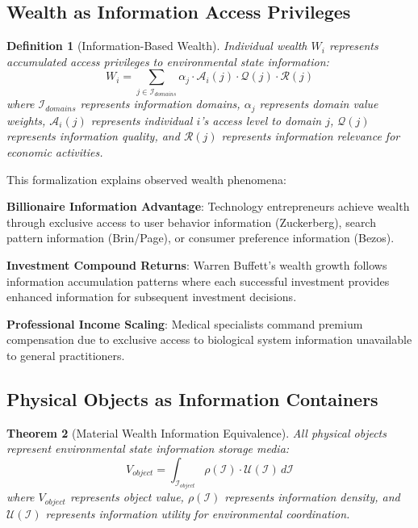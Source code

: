 \documentclass[12pt,a4paper]{article}
\newtheorem{theorem}{Theorem}
\newtheorem{definition}[theorem]{Definition}
\begin{document}
\subsection{Wealth as Information Access Privileges}

\begin{definition}[Information-Based Wealth]
Individual wealth $W_i$ represents accumulated access privileges to environmental state information:
\begin{equation}
W_i = \sum_{j \in \mathcal{I}_{domains}} \alpha_j \cdot \mathcal{A}_i(j) \cdot \mathcal{Q}(j) \cdot \mathcal{R}(j)
\end{equation}
where $\mathcal{I}_{domains}$ represents information domains, $\alpha_j$ represents domain value weights, $\mathcal{A}_i(j)$ represents individual $i$'s access level to domain $j$, $\mathcal{Q}(j)$ represents information quality, and $\mathcal{R}(j)$ represents information relevance for economic activities.
\end{definition}

This formalization explains observed wealth phenomena:

\textbf{Billionaire Information Advantage}: Technology entrepreneurs achieve wealth through exclusive access to user behavior information (Zuckerberg), search pattern information (Brin/Page), or consumer preference information (Bezos).

\textbf{Investment Compound Returns}: Warren Buffett's wealth growth follows information accumulation patterns where each successful investment provides enhanced information for subsequent investment decisions.

\textbf{Professional Income Scaling}: Medical specialists command premium compensation due to exclusive access to biological system information unavailable to general practitioners.

\subsection{Physical Objects as Information Containers}

\begin{theorem}[Material Wealth Information Equivalence]
All physical objects represent environmental state information storage media:
\begin{equation}
V_{object} = \int_{\mathcal{I}_{object}} \rho(\mathcal{I}) \cdot \mathcal{U}(\mathcal{I}) \, d\mathcal{I}
\end{equation}
where $V_{object}$ represents object value, $\rho(\mathcal{I})$ represents information density, and $\mathcal{U}(\mathcal{I})$ represents information utility for environmental coordination.
\end{theorem}
\end{document}
